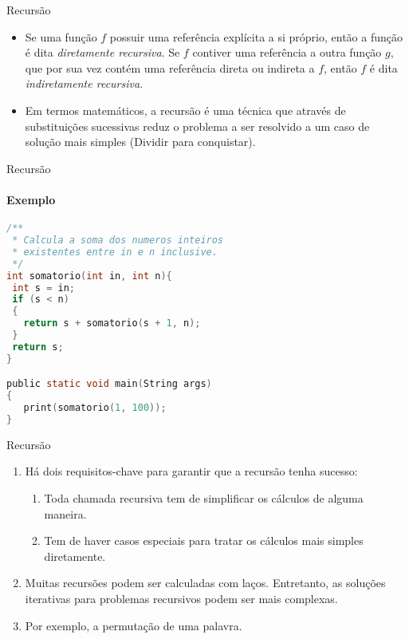 \begin{frame}[fragile]{Recursão}
\begin{itemize}
	\item Se uma função $f$ possuir uma referência explícita a si próprio, então a função é dita \textit{diretamente recursiva}. Se $f$ contiver uma referência a outra função $g$, que por sua vez contém uma referência direta ou indireta a $f$, então $f$ é dita \textit{indiretamente recursiva}.
	\item Em termos matemáticos, a recursão é uma técnica que através de substituições sucessivas reduz o problema a ser resolvido a um caso de solução mais simples (Dividir para conquistar).
\end{itemize}
\end{frame}


\begin{frame}[fragile]{Recursão}
\framesubtitle{Exemplo}
\footnotesize
\begin{lstlisting}[language=C]
/**
 * Calcula a soma dos numeros inteiros 
 * existentes entre in e n inclusive.
 */
int somatorio(int in, int n){   
 int s = in;
 if (s < n)
 {      
   return s + somatorio(s + 1, n);
 }
 return s;
}

public static void main(String args)
{    
   print(somatorio(1, 100));
}
\end{lstlisting}
\end{frame}



\begin{frame}[fragile]{Recursão}
\begin{enumerate}
	\item Há dois requisitos-chave para garantir que a recursão tenha sucesso:	
			\begin{enumerate}
				\item Toda chamada recursiva tem de simplificar os cálculos de alguma maneira.
				\item Tem de haver casos especiais para tratar os cálculos mais simples diretamente.
			\end{enumerate}
	\item Muitas recursões podem ser calculadas com laços. Entretanto, as soluções iterativas para problemas recursivos podem ser mais complexas.
	\item Por exemplo, a permutação de uma palavra.
\end{enumerate}
\end{frame}

